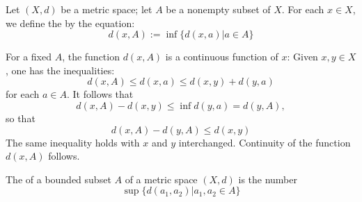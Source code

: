 \documentclass[12pt, a4paper, oneside, openright, titlepage]{book}
\begin{document}
\begin{defn}
    Let $(X,d)$ be a metric space; let $A$ be a nonempty subset of $X$. For each $x \in X$, we define the  by the equation: \begin{equation*}
        d(x,A) := \inf\{d(x,a)\vert a \in A\}
    \end{equation*}
\end{defn}

For a fixed $A$, the function $d(x,A)$ is a continuous function of $x$: Given $x,y \in X$, one has the inequalities: \begin{equation*}
    d(x,A) \leq d(x,a) \leq d(x,y)+d(y,a)
\end{equation*}
for each $a \in A$. It follows that \begin{equation*}
    d(x,A) - d(x,y) \leq \inf d(y,a) = d(y,A),
\end{equation*}
so that \begin{equation*}
    d(x,A) - d(y,A) \leq d(x,y)
\end{equation*}
The same inequality holds with $x$ and $y$ interchanged. Continuity of the function $d(x,A)$ follows.

\begin{defn}
    The  of a bounded subset $A$ of a metric space $(X,d)$ is the number \begin{equation*}
        \sup\{d(a_1,a_2)\vert a_1,a_2 \in A\}
    \end{equation*}
\end{defn}
\end{document}
